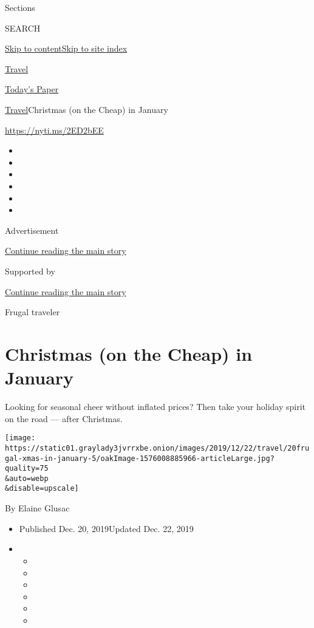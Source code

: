 Sections

SEARCH

\protect\hyperlink{site-content}{Skip to
content}\protect\hyperlink{site-index}{Skip to site index}

\href{https://www.nytimes3xbfgragh.onion/section/travel}{Travel}

\href{https://myaccount.nytimes3xbfgragh.onion/auth/login?response_type=cookie\&client_id=vi}{}

\href{https://www.nytimes3xbfgragh.onion/section/todayspaper}{Today's
Paper}

\href{/section/travel}{Travel}\textbar{}Christmas (on the Cheap) in
January

\url{https://nyti.ms/2ED2bEE}

\begin{itemize}
\item
\item
\item
\item
\item
\item
\end{itemize}

Advertisement

\protect\hyperlink{after-top}{Continue reading the main story}

Supported by

\protect\hyperlink{after-sponsor}{Continue reading the main story}

Frugal traveler

\hypertarget{christmas-on-the-cheap-in-january}{%
\section{Christmas (on the Cheap) in
January}\label{christmas-on-the-cheap-in-january}}

Looking for seasonal cheer without inflated prices? Then take your
holiday spirit on the road --- after Christmas.

\texttt{[image: https://static01.graylady3jvrrxbe.onion/images/2019/12/22/travel/20frugal-xmas-in-january-5/oakImage-1576008885966-articleLarge.jpg?quality=75\\\&auto=webp\\\&disable=upscale]}

By Elaine Glusac

\begin{itemize}
\item
  Published Dec. 20, 2019Updated Dec. 22, 2019
\item
  \begin{itemize}
  \item
  \item
  \item
  \item
  \item
  \item
  \end{itemize}
\end{itemize}

